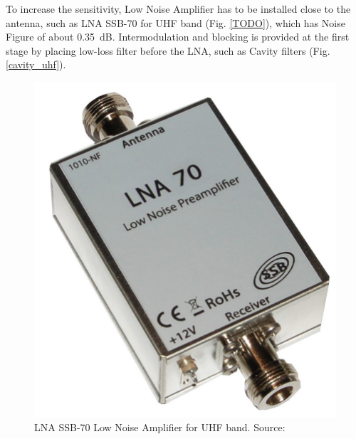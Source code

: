 To increase the sensitivity, Low Noise Amplifier has to be installed close to the antenna, such as LNA SSB-70 for UHF band (Fig. \ref{TODO}), which has Noise Figure of about \SI{0.35}{\dB}. Intermodulation and blocking is provided at the first stage by placing low-loss filter before the LNA, such as Cavity filters (Fig. \ref{cavity_uhf}).

\begin{minipage}{\linewidth}
    \centering
    \begin{minipage}{0.45\linewidth}
        \begin{figure}[H]
            \centering
            \includegraphics[width=0.3\paperwidth]{img/1/ssb_lna70.jpg}
            \caption{LNA SSB-70 Low Noise Amplifier for UHF band. Source: \cite{ssb_lna70}}
            \label{ssb_lna70}
        \end{figure}
    \end{minipage}
    \hspace{0.05\linewidth}
    \begin{minipage}{0.45\linewidth}
        \begin{figure}[H]
            \centering

\end{figure}
\end{minipage}
\end{minipage}
